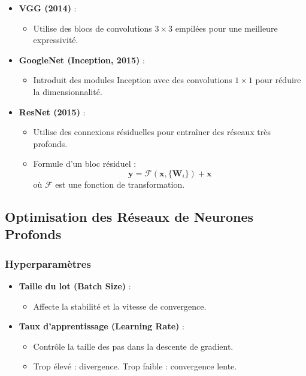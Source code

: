 \documentclass[a4paper,portrait]{article}
\begin{document}
\begin{multicols}{2}
\begin{itemize}
    \item \textbf{VGG (2014)} :
    \begin{itemize}
        \item Utilise des blocs de convolutions \( 3 \times 3 \) empilées pour une meilleure expressivité.
    \end{itemize}

    \item \textbf{GoogleNet (Inception, 2015)} :
    \begin{itemize}
        \item Introduit des modules Inception avec des convolutions \( 1 \times 1 \) pour réduire la dimensionnalité.
    \end{itemize}

    \item \textbf{ResNet (2015)} :
    \begin{itemize}
        \item Utilise des connexions résiduelles pour entraîner des réseaux très profonds.
        \item Formule d'un bloc résiduel :
        \[
        \mathbf{y} = \mathcal{F}(\mathbf{x}, \{\mathbf{W}_i\}) + \mathbf{x}
        \]
        où \( \mathcal{F} \) est une fonction de transformation.
    \end{itemize}
\end{itemize}



\subsection{Optimisation des Réseaux de Neurones Profonds}

\subsubsection{Hyperparamètres}

\begin{itemize}
    \item \textbf{Taille du lot (Batch Size)} :
    \begin{itemize}
        \item Affecte la stabilité et la vitesse de convergence.
    \end{itemize}

    \item \textbf{Taux d'apprentissage (Learning Rate)} :
    \begin{itemize}
        \item Contrôle la taille des pas dans la descente de gradient.
        \item Trop élevé : divergence. Trop faible : convergence lente.
    \end{itemize}


\end{itemize}
\end{multicols}
\end{document}

